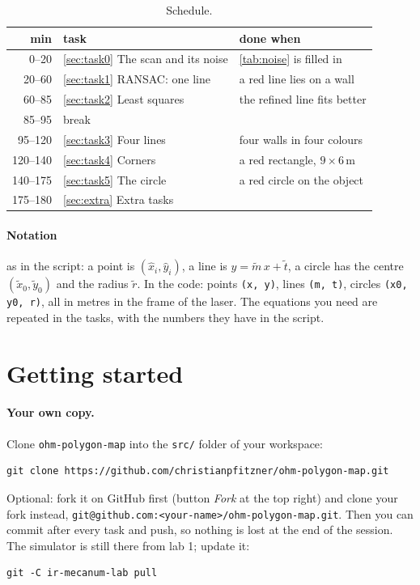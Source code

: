 \documentclass[11pt,a4paper,parskip=half]{scrartcl}
\newcommand{\thema}[1]{\texttt{#1}}
\newcommand{\datei}[1]{\texttt{#1}}
\begin{document}
\begin{table}[ht]\centering
\caption{Schedule.}
\label{tab:schedule}
\begin{tabular}{@{}rll@{}}
\toprule
min & task & done when \\
\midrule
0--20 & \cref{sec:task0} The scan and its noise & \cref{tab:noise} is filled in \\
20--60 & \cref{sec:task1} RANSAC: one line & a red line lies on a wall \\
60--85 & \cref{sec:task2} Least squares & the refined line fits better \\
85--95 & break & \\
95--120 & \cref{sec:task3} Four lines & four walls in four colours \\
120--140 & \cref{sec:task4} Corners & a red rectangle, \(9 \times 6\)\,m \\
140--175 & \cref{sec:task5} The circle & a red circle on the object \\
175--180 & \cref{sec:extra} Extra tasks & \\
\bottomrule
\end{tabular}
\end{table}

\paragraph{Notation} as in the script: a point is \((\hat x_i, \hat y_i)\), a line is
\(y = \tilde m\,x + \tilde t\), a circle has the centre \((\tilde x_0, \tilde y_0)\) and the radius
\(\tilde r\). In the code: points \thema{(x, y)}, lines \thema{(m, t)}, circles \thema{(x0, y0, r)}, all
in metres in the frame of the laser. The equations you need are repeated in the tasks, with the numbers
they have in the script.

\newpage
\section{Getting started}
\paragraph{Your own copy.} Clone \datei{ohm-polygon-map} into the \datei{src/} folder of your workspace:
\begin{lstlisting}
git clone https://github.com/christianpfitzner/ohm-polygon-map.git
\end{lstlisting}
Optional: fork it on GitHub first (button \emph{Fork} at the top right) and clone your fork instead,
\thema{git@github.com:<your-name>/ohm-polygon-map.git}. Then you can commit after every task and push,
so nothing is lost at the end of the session.
The simulator is still there from lab 1; update it:
\begin{lstlisting}
git -C ir-mecanum-lab pull
\end{lstlisting}
\end{document}
